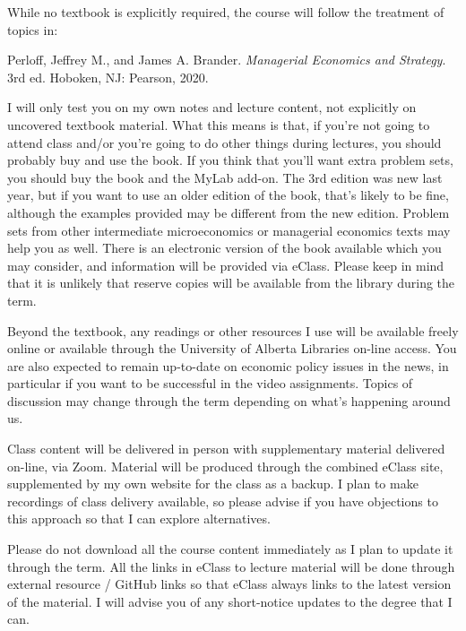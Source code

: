 \documentclass[11pt,]{article}
\begin{document}
While no textbook is explicitly required, the course will follow the
treatment of topics in:

\begin{center}
\begin{minipage}{.8\linewidth}
Perloff, Jeffrey M., and James A. Brander. \textit{Managerial Economics and Strategy}. 3rd ed. Hoboken, NJ: Pearson, 2020.
\end{minipage}
\end{center}

I will only test you on my own notes and lecture content, not explicitly on uncovered textbook material.
What this means is that, if you're not going to attend class and/or
you're going to do other things during lectures, you should probably buy
and use the book. If you think that you'll want extra problem sets, you
should buy the book and the MyLab add-on. The 3rd edition was new last
year, but if you want to use an older edition of the book, that's likely
to be fine, although the examples provided may be different from the new
edition. Problem sets from other intermediate microeconomics or
managerial economics texts may help you as well. There is an
electronic version of the book available which you may consider, and information will be provided via eClass. Please keep in mind that it is unlikely that reserve copies will be available
from the library during the term.

Beyond the textbook, any readings or other resources I use will be
available freely online or available through the University of Alberta
Libraries on-line access. You are also expected to remain up-to-date on
economic policy issues in the news, in particular if you want to be
successful in the video assignments. Topics of discussion
may change through the term depending on what's happening around us.

Class content will be delivered in person with supplementary material delivered on-line, via Zoom. Material will be produced through the combined eClass site, supplemented by my own website for the class as a backup. I plan to make recordings of class delivery available, so please advise if you have objections to this approach so
that I can explore alternatives.

Please do not download all the course content immediately as I plan to
update it through the term. All the links in eClass to lecture material
will be done through external resource / GitHub links so that eClass always links to
the latest version of the material. I will advise you of any
short-notice updates to the degree that I can.
\end{document}
